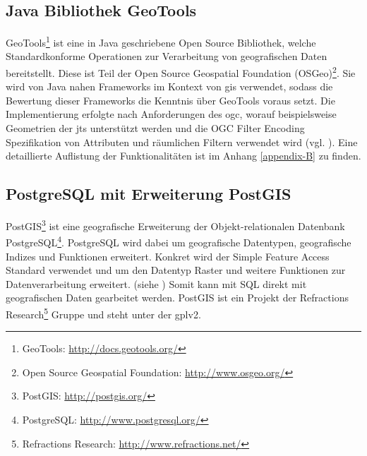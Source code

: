 \subsection{Java Bibliothek GeoTools}
\label{geotools}
GeoTools\footnote{GeoTools: \url{http://docs.geotools.org/}} ist eine in Java geschriebene Open Source Bibliothek, welche Standardkonforme Operationen zur Verarbeitung von geografischen Daten bereitstellt.
Diese ist Teil der Open Source Geospatial Foundation (OSGeo)\footnote{Open Source Geospatial Foundation: \url{http://www.osgeo.org/}}.
Sie wird von Java nahen Frameworks im Kontext von \Gls{gis} verwendet, sodass die Bewertung dieser Frameworks die Kenntnis über GeoTools voraus setzt.
Die Implementierung erfolgte nach Anforderungen des \Gls{ogc}, worauf beispielsweise Geometrien der \Gls{jts} unterstützt werden und die OGC Filter Encoding Spezifikation von Attributen und räumlichen Filtern verwendet wird (vgl. \cite{website:geotools}).
Eine detaillierte Auflistung der Funktionalitäten ist im Anhang \ref{appendix-B} zu finden.

\subsection{PostgreSQL mit Erweiterung PostGIS}
PostGIS\footnote{PostGIS: \url{http://postgis.org/}} ist eine geografische Erweiterung der Objekt-relationalen Datenbank \mbox{PostgreSQL}\footnote{PostgreSQL: \url{http://www.postgresql.org/}}.
PostgreSQL wird dabei um geografische Datentypen, geografische Indizes und Funktionen erweitert.
Konkret wird der Simple Feature Access Standard verwendet und um den Datentyp Raster und weitere Funktionen zur Datenverarbeitung erweitert. (siehe \cite{website:postgisdocu-opengis})
Somit kann mit SQL direkt mit geografischen Daten gearbeitet werden.
PostGIS ist ein Projekt der Refractions Research\footnote{Refractions Research: \url{http://www.refractions.net/}} Gruppe und steht unter der \Gls{gpl}v2.


